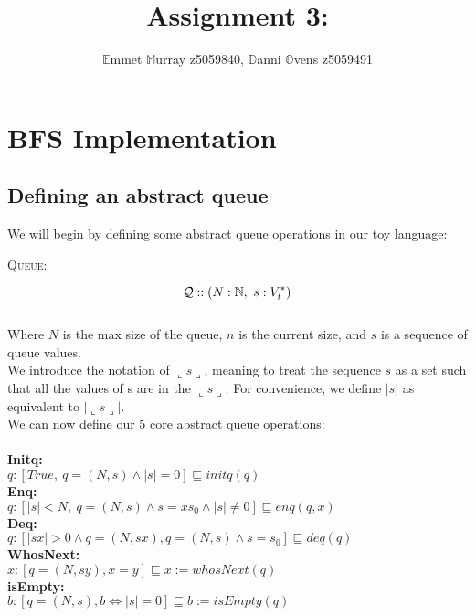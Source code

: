 \documentclass[a4paper]{scrartcl}
\title{Assignment 3:}
\author{$\mathbb{E}$mmet $\mathbb{M}$urray z5059840, $\mathbb{D}$anni $\mathbb{O}$vens z5059491}
\newcommand{\N}{\mathbb{N}}
\newcommand{\refinedby}{\sqsubseteq} %
\begin{document}
\maketitle
\section{BFS Implementation}
%
\subsection{Defining an abstract queue}
We will begin by defining some abstract queue operations in our toy language: \\
\begin{center}
{\LARGE{\textsc{Queue:}}\normalsize}
\end{center}
\begin{equation*}
\mathcal{Q} :: ( N:\N, ~s:V_{t}^{*} ) \\
\end{equation*} \\
%
Where $N$ is the max size of the queue, $n$ is the current size, and $s$ is a sequence of queue values. \\
%
We introduce the notation of $\llcorner s \lrcorner$, meaning to treat the sequence $s$ as a set such that all the values of s are in the $\llcorner s \lrcorner$. For convenience, we define $|s|$ as equivalent to $|\llcorner s \lrcorner|$.\\
%
We can now define our 5 core abstract queue operations: \\ \\
%
\textbf{Initq:} \\
$q : [True, ~ q = ( N, s) \land |s| = 0] \refinedby initq(q)$ \\
\textbf{Enq:} \\
$q : [|s| < N, ~ q = ( N, s) \land s = xs_0 \land |s| \neq 0] \refinedby enq(q, x)$ \\
\textbf{Deq:} \\
$q : [|sx| > 0 \land q = (N, sx), q = (N, s) \land s = s_0 ] \refinedby  deq(q)$ \\
\textbf{WhosNext:} \\
$x : [q = (N, sy), x = y] \refinedby x := whosNext(q)$ \\
\textbf{isEmpty:} \\
$b : [q = (N, s), b \iff |s| = 0 ] \refinedby b := isEmpty(q)$\\
%
\pagebreak
\end{document}
